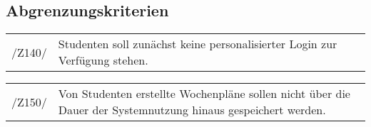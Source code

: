 \subsection{Abgrenzungskriterien}

\begin{tabular}{p{1.5cm}p{14.5cm}}	
	 /Z140/& Studenten soll zunächst keine personalisierter Login zur Verfügung stehen.  \\[0.25cm]
\end{tabular}

\begin{tabular}{p{1.5cm}p{14.5cm}}	
	 /Z150/& Von Studenten erstellte Wochenpläne sollen nicht über die Dauer der Systemnutzung hinaus gespeichert werden. \\[0.25cm]
\end{tabular}